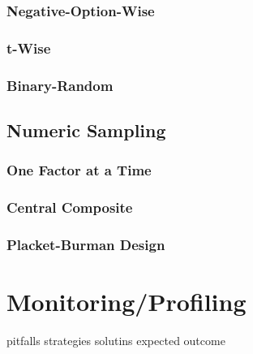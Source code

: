 \subsubsection{Negative-Option-Wise}

\subsubsection{t-Wise}

\subsubsection{Binary-Random}



\subsection{Numeric Sampling}

\subsubsection{One Factor at a Time}

\subsubsection{Central Composite}

\subsubsection{Placket-Burman Design}


\section{Monitoring/Profiling}
pitfalls
strategies 
solutins
expected outcome
